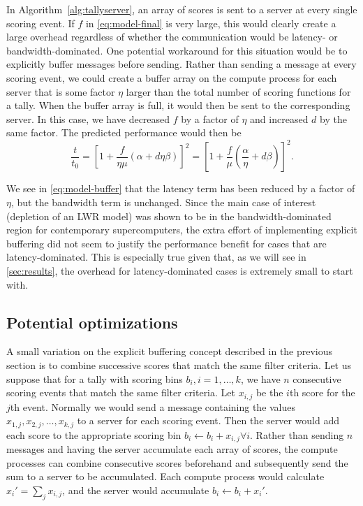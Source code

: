 \documentclass[3p]{elsarticle}
\begin{document}
In Algorithm~\ref{alg:tallyserver}, an array of scores is sent to a server at
every single scoring event. If $f$ in \eqref{eq:model-final} is very large, this
would clearly create a large overhead regardless of whether the communication
would be latency- or bandwidth-dominated. One potential workaround for this
situation would be to explicitly buffer messages before sending. Rather than
sending a message at every scoring event, we could create a buffer array on the
compute process for each server that is some factor $\eta$ larger than the total
number of scoring functions for a tally. When the buffer array is full, it would
then be sent to the corresponding server. In this case, we have decreased $f$ by
a factor of $\eta$ and increased $d$ by the same factor. The predicted
performance would then be
\begin{equation}
  \label{eq:model-buffer}
  \frac{t}{t_0} = \left [ 1 + \frac{f}{\eta\mu} \left ( \alpha + d\eta\beta
    \right ) \right ]^2 = \left [ 1 + \frac{f}{\mu} \left ( \frac{\alpha}{\eta}
    + d\beta \right ) \right ]^2.
\end{equation}

\noindent We see in \eqref{eq:model-buffer} that the latency term has been
reduced by a factor of $\eta$, but the bandwidth term is unchanged. Since the
main case of interest (depletion of an LWR model) was shown to be in the
bandwidth-dominated region for contemporary supercomputers, the extra effort of
implementing explicit buffering did not seem to justify the performance benefit
for cases that are latency-dominated. This is especially true given that, as we
will see in \autoref{sec:results}, the overhead for latency-dominated cases is
extremely small to start with.

\subsection{Potential optimizations}

A small variation on the explicit buffering concept described in the previous
section is to combine successive scores that match the same filter criteria. Let
us suppose that for a tally with scoring bins $b_i, i = 1, \dots, k$, we have
$n$ consecutive scoring events that match the same filter criteria. Let
$x_{i,j}$ be the $i$th score for the $j$th event. Normally we would send a
message containing the values $x_{1,j}, x_{2,j}, \dots, x_{k,j}$ to a server for
each scoring event. Then the server would add each score to the appropriate
scoring bin $b_i \gets b_i + x_{i,j} \forall i$. Rather than sending $n$
messages and having the server accumulate each array of scores, the compute
processes can combine consecutive scores beforehand and subsequently send the
sum to a server to be accumulated. Each compute process would calculate $x_i' =
\sum_j x_{i,j}$, and the server would accumulate $b_i \gets b_i + x_i'$.
\end{document}
